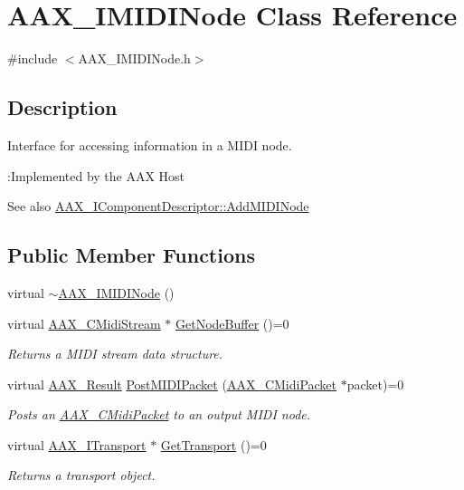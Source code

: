 \hypertarget{a00105}{}\section{A\+A\+X\+\_\+\+I\+M\+I\+D\+I\+Node Class Reference}
\label{a00105}


{\ttfamily \#include $<$A\+A\+X\+\_\+\+I\+M\+I\+D\+I\+Node.\+h$>$}



\subsection{Description}
Interface for accessing information in a M\+I\+D\+I node. 

\begin{DoxyRefDesc}{\+:\+Implemented by the A\+A\+X Host}
\item[\hyperlink{a00001__aax_host_implementation000009}{\+:\+Implemented by the A\+A\+X Host}]\end{DoxyRefDesc}


\begin{DoxySeeAlso}{See also}
\hyperlink{a00088_a6284dda9ccca898e33075de29dad4e39}{A\+A\+X\+\_\+\+I\+Component\+Descriptor\+::\+Add\+M\+I\+D\+I\+Node} 
\end{DoxySeeAlso}
\subsection*{Public Member Functions}
\begin{DoxyCompactItemize}
\item 
virtual \hyperlink{a00105_ad9b4ebff12e979094504e8630f7b861a}{$\sim$\+A\+A\+X\+\_\+\+I\+M\+I\+D\+I\+Node} ()
\item 
virtual \hyperlink{a00025}{A\+A\+X\+\_\+\+C\+Midi\+Stream} $\ast$ \hyperlink{a00105_a794f1c0d19ac6720382c23b0a4dc2b17}{Get\+Node\+Buffer} ()=0
\begin{DoxyCompactList}\small\item\em Returns a M\+I\+D\+I stream data structure. \end{DoxyCompactList}\item 
virtual \hyperlink{a00149_a4d8f69a697df7f70c3a8e9b8ee130d2f}{A\+A\+X\+\_\+\+Result} \hyperlink{a00105_a5e1c5409158164f57376f908c9693a8b}{Post\+M\+I\+D\+I\+Packet} (\hyperlink{a00024}{A\+A\+X\+\_\+\+C\+Midi\+Packet} $\ast$packet)=0
\begin{DoxyCompactList}\small\item\em Posts an \hyperlink{a00024}{A\+A\+X\+\_\+\+C\+Midi\+Packet} to an output M\+I\+D\+I node. \end{DoxyCompactList}\item 
virtual \hyperlink{a00116}{A\+A\+X\+\_\+\+I\+Transport} $\ast$ \hyperlink{a00105_a57bd132ee74047e25298b157c0bff2f9}{Get\+Transport} ()=0
\begin{DoxyCompactList}\small\item\em Returns a transport object. \end{DoxyCompactList}\end{DoxyCompactItemize}


